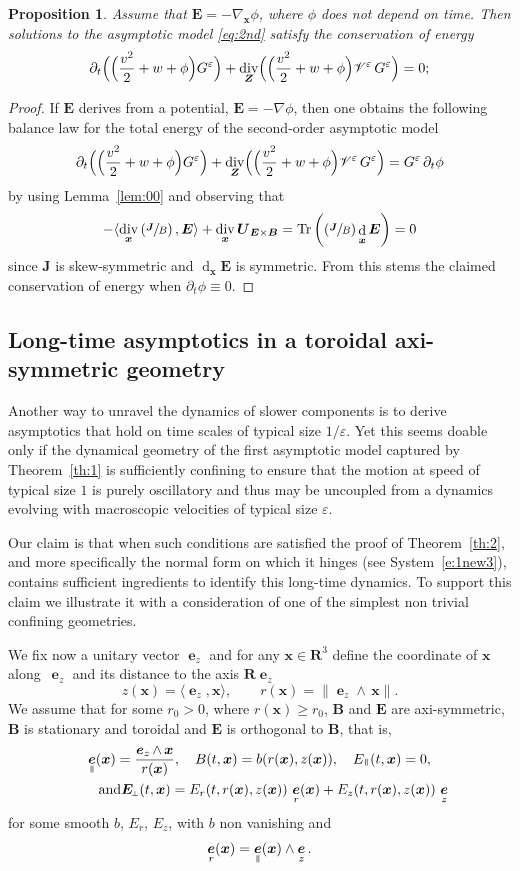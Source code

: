 \documentclass[10pt]{amsart}
\let\mathcal\mathscr
\newcommand{\sperp}{{\scriptscriptstyle\perp}}
\newcommand{\Psfrac}[2]{(\sfrac{#1}{#2})}
\let\eps\varepsilon
\let\d\partial
\DeclareMathOperator\dD{d}\let\dd\dD
\DeclareMathOperator{\Tr}{Tr}
\DeclareMathOperator{\Div}{div}
\theoremstyle{plain}
\newtheorem{proposition}[theorem]{Proposition}
\theoremstyle{definition}
\newcommand{\bpr}{\begin{proposition}}
\newcommand{\epr}{\end{proposition}}
\newcommand\R{\mathbf R}
\newcommand\bB{{\boldsymbol B}}
\newcommand\bE{{\boldsymbol E}}
\newcommand\bJ{{\boldsymbol J}}
\newcommand\bU{{\boldsymbol U}}
\newcommand\bfx{{\boldsymbol x}}
\newcommand\bfZ{{\boldsymbol Z}}
\newcommand\cV{{\mathcal V}}
\DeclareMathOperator{\beD}{\boldsymbol{e}}
\newcommand\eDr{\beD_r}
\newcommand\eDz{\beD_z}
\newcommand\eDpar{\beD_\mypar}
\let\e w
\newcommand\Epar{E_\mypar}
\newcommand\Eperp{\bE_{\!\sperp}}
\newcommand\Er{E_r}
\newcommand\Ez{E_z}
\newcommand{\EcB}{\bU_{\bE\times\bB}}
\newcommand{\mypar}{{\mkern3mu\vphantom{\perp}\vrule depth 0pt\mkern2mu\vrule depth 0pt\mkern3mu}}
\begin{document}
\bpr
Assume that $\bE=-\nabla_\bfx\phi$, where $\phi$ does not depend on time. Then solutions to the asymptotic model \eqref{eq:2nd} satisfy the conservation of energy
\[
\d_t \Bigl(\Bigl(\frac{v^2}{2}+\e+\phi\Bigr)G^\eps\Bigr)+\Div_{\bfZ} \Bigl(\Bigl(\frac{v^2}{2}+\e+\phi\Bigr)\cV^\eps\, G^\eps\Bigr)
=0;
\]
\epr
\begin{proof}
If $\bE$ derives from a potential, $\bE=-\nabla\phi$, then one obtains the following balance law for the total energy of the second-order asymptotic model
\[
\d_t \Bigl(\Bigl(\frac{v^2}{2}+\e+\phi\Bigr)G^\eps\Bigr)+\Div_{\bfZ} \Bigl(\Bigl(\frac{v^2}{2}+\e+\phi\Bigr)\cV^\eps \,G^\eps\Bigr)
=G^\eps\,\d_t\phi
\]
by using Lemma~\ref{lem:00} and observing that
\[
-\langle
\Div_\bfx\left(\sfrac{\bJ}{B}\right),\bE\rangle
+\Div_\bfx\EcB
=
\Tr\left(\Psfrac{\bJ}{B}\dD_\bfx\bE\right)=0
\]
since $\bJ$ is skew-symmetric and $\dD_\bfx\bE$ is symmetric. From this stems the claimed conservation of energy when $\d_t\phi\equiv0$.
\end{proof}

\subsection{Long-time asymptotics in a toroidal axi-symmetric geometry}\label{s:poloidal-results}

Another way to unravel the dynamics of slower components is to derive asymptotics that hold on time scales of typical size $1/\eps$. Yet this seems doable only if the dynamical geometry of the first asymptotic model captured by Theorem~\ref{th:1} is sufficiently confining to ensure that the motion at speed of typical size $1$ is purely oscillatory and thus may be uncoupled from a dynamics evolving with macroscopic velocities of typical size $\eps$.

Our claim is that when such conditions are satisfied the proof of Theorem~\ref{th:2}, and more specifically the normal form on which it hinges (see System~\eqref{e:1new3}), contains sufficient ingredients to identify this long-time dynamics. To support this claim we illustrate it with a consideration of one of the simplest non trivial confining geometries.

We fix now a unitary vector $\eDz$ and for any $\bfx\in\R^3$ define the coordinate of $\bfx$ along~$\eDz$ and its distance to the axis $\R\eDz$
\[
z(\bfx)=\langle\eDz,\bfx\rangle,\qquad
r(\bfx)=\|\eDz\wedge\,\bfx\|.
\]
We assume that for some $r_0>0$, where $r(\bfx)\geq r_0$, $\bB$ and $\bE$ are axi-symmetric, $\bB$ is stationary and toroidal and $\bE$ is orthogonal to $\bB$, that is,
\begin{gather*}
\eDpar(\bfx)=\frac{\eDz\wedge\,\bfx}{r(\bfx)},\quad
B(t,\bfx)=b(r(\bfx),z(\bfx)),\quad\Epar(t,\bfx)=0,
\\
\tag*{and}
\Eperp(t,\bfx)=\Er(t,r(\bfx),z(\bfx))\,\eDr(\bfx)+\Ez(t,r(\bfx),z(\bfx))\,\eDz
\end{gather*}
for some smooth $b$, $\Er$, $\Ez$, with $b$ non vanishing and
\[
\eDr(\bfx)=\eDpar(\bfx)\wedge\eDz.
\]
\end{document}
